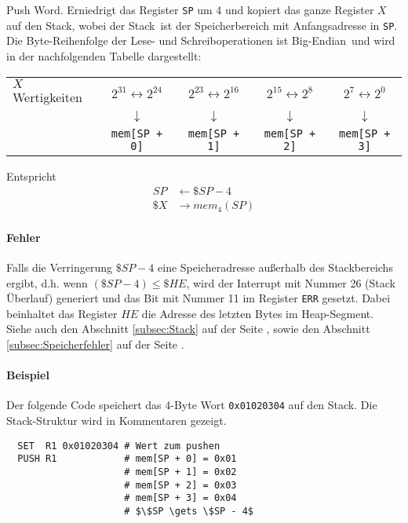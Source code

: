 \glqq Push Word\grqq.
Erniedrigt das Register \texttt{SP} um 4 und kopiert das ganze Register $X$ auf
den Stack, wobei der \glqq Stack\grqq\ ist der Speicherbereich mit
Anfangsadresse in \texttt{SP}.
Die Byte-Reihenfolge der Lese- und Schreiboperationen ist \glqq Big-Endian\grqq\
und wird in der nachfolgenden Tabelle dargestellt:
\begin{center}
\begin{tabular}{l|cccc}
  \toprule
  $X$  Wertigkeiten &
  $2^{31} \leftrightarrow 2^{24}$ &
  $2^{23} \leftrightarrow 2^{16}$ &
  $2^{15} \leftrightarrow 2^{8}$  &
  $2^{7}  \leftrightarrow 2^{0}$ 
  \\
  &
  $\downarrow$ & $\downarrow$ & $\downarrow$ & $\downarrow$ 
  \\
  \text{Stack-Bereich} &
  \texttt{mem[SP + 0]} &
  \texttt{mem[SP + 1]} &
  \texttt{mem[SP + 2]} &
  \texttt{mem[SP + 3]}
  \\\bottomrule
\end{tabular}
\end{center}


Entspricht
\begin{align*}
   SP & \gets \$SP - 4    \\
 \$X  & \to mem_{4}(SP)
\end{align*}


\paragraph{Fehler}
Falls die Verringerung $\$SP - 4$ eine Speicheradresse außerhalb des
Stackbereichs ergibt, d.h. wenn $(\$SP -4) \leq \$HE$, wird der Interrupt mit
Nummer 26 (Stack Überlauf) \index{Stack!Überlauf} generiert und das Bit mit
Nummer 11 im Register \texttt{ERR} gesetzt. Dabei beinhaltet das Register $HE$
die Adresse des letzten Bytes im Heap-Segment. Siehe auch den Abschnitt
\ref{subsec:Stack} auf der Seite \pageref{subsec:Stack}, sowie den Abschnitt
\ref{subsec:Speicherfehler} auf der Seite \pageref{subsec:Speicherfehler}.


\paragraph{Beispiel}
Der folgende Code speichert das 4-Byte Wort \texttt{0x01020304} auf den Stack.
Die Stack-Struktur wird in Kommentaren gezeigt.
\begin{lstlisting}
  SET  R1 0x01020304 # Wert zum pushen
  PUSH R1            # mem[SP + 0] = 0x01
                     # mem[SP + 1] = 0x02
                     # mem[SP + 2] = 0x03
                     # mem[SP + 3] = 0x04
                     # $\$SP \gets \$SP - 4$
\end{lstlisting}




